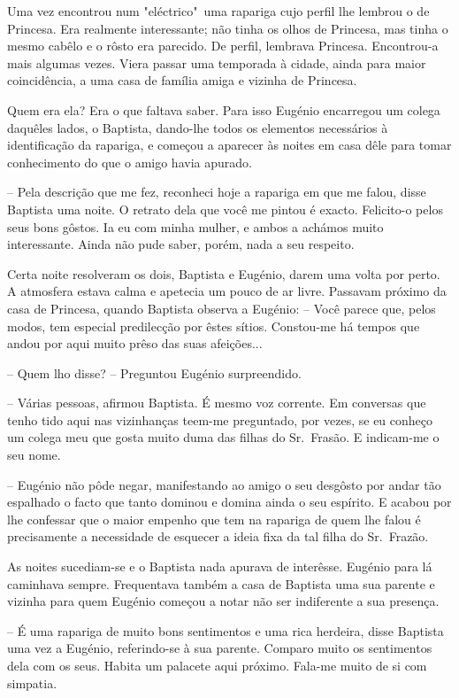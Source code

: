 \documentclass[9pt]{article}
\begin{document}
Uma vez encontrou num "eléctrico"\ uma rapariga cujo perfil
\-lhe lembrou o de Princesa. Era realmente interessante; não tinha os
o\-lhos de Princesa, mas tinha o mesmo cabêlo e o rôsto era parecido. De
perfil, lembrava Princesa. Encontrou-a mais algumas vezes. Viera passar uma temporada à cidade, ainda para maior coincidên\-cia, a uma casa
de fa\-mí\-lia amiga e vizinha de Princesa.

Quem era ela? Era o que faltava saber. Para isso Eugé\-nio encarregou um colega da\-quê\-les lados, o Baptista, dando-\-lhe todos os elementos
necessários à identifi\-ca\-ção da rapariga, e começou a aparecer às noites
em casa dêle para tomar conhecimento do que o amigo havia apurado.

-- Pela descri\-ção que me fez, reconheci hoje a rapariga em que me
falou, disse Baptista uma noite. O retrato dela que você me pintou é
exacto. Felicito-o pelos seus bons gôstos. Ia eu com minha mu\-lher,
e ambos a achámos muito interessante. Ainda não pude saber, porém, nada a seu
respeito.

Certa noite resolveram os dois, Baptista e Eugé\-nio, darem uma volta por perto. A atmosfera estava calma e apetecia um pouco de ar livre.
Passavam próximo da casa de Princesa, quan\-do Baptista observa a Eugé\-nio: -- Você parece que, pelos modos, tem especial predilec\-ção por êstes sítios. Constou-me há tempos que andou por aqui muito prêso das suas afei\-ções...

-- Quem lho disse? -- Preguntou Eugé\-nio surpreendido.

-- Várias pessoas, afirmou Baptista. É mesmo voz corrente. Em conversas
que tenho tido aqui nas vizinhan\-ças teem-me preguntado, por vezes, se
eu conheço um colega meu que gosta muito duma das fi\-lhas do Sr.\ Frasão. E indicam-me o seu nome.

-- Eugé\-nio não pôde negar, manifestando ao amigo o seu desgôsto
por andar tão espa\-lhado o facto que tanto dominou e domina ainda o
seu espírito. E acabou por lhe confessar que o maior empenho que tem
na rapariga de quem lhe falou é precisamente a necessidade de esque\-cer
a ideia fixa da tal fi\-lha do Sr.\ Frazão.

As noites sucediam-se e o Baptista nada apurava de interêsse.
Eugé\-nio para lá caminhava sempre. Frequentava também a casa de Baptista uma sua parente e vizinha para quem Eugé\-nio começou a notar não
ser indiferente a sua presença.

-- É uma rapariga de muito bons sentimentos e uma rica herdeira,
disse Baptista uma vez a Eugé\-nio, referindo-se à sua parente. Comparo
muito os sentimentos dela com os seus. Habita um palacete aqui próximo.
Fala-me muito de si com simpatia.
\end{document}
